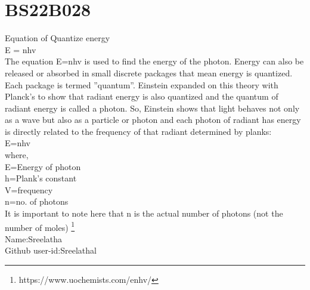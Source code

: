 \section{BS22B028}
Equation of Quantize energy\\
E = nhv \\
The equation E=nhv is used to find the energy of the photon. Energy can also be released or absorbed in small discrete packages that mean energy is quantized. Each
package is termed ”quantum”. Einstein expanded on this theory with Planck’s to show that radiant energy is also quantized and the quantum of radiant energy is called
a photon. So, Einstein shows that light behaves not only as a wave but also as a particle or photon and each photon of radiant has energy is directly related to the
frequency of that radiant determined by planks:\\
E=nhv \\
where,\\
E=Energy of photon\\
h=Plank’s constant\\
V=frequency\\
n=no. of photons\\
It is important to note here that n is the actual number of photons (not the number of moles) \footnote{https://www.uochemists.com/enhv/}\\
Name:Sreelatha\\
Github user-id:Sreelathal

